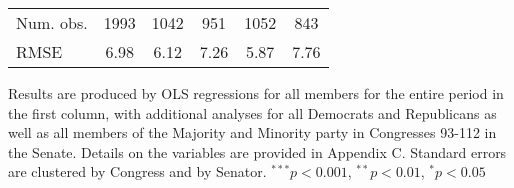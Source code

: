 \documentclass[12pt]{article}
\begin{document}
\begin{table}[H]
\begin{threeparttable}
\begin{tabular}{l c c c c c }
Num. obs.             & 1993          & 1042         & 951            & 1052         & 843          \\
RMSE                  & 6.98          & 6.12         & 7.26           & 5.87         & 7.76         \\
\hline
\end{tabular}
\begin{tablenotes}
   \item
   Results are produced by OLS regressions for all members for the entire period in the first column, with additional analyses for all Democrats and Republicans as well as all members of the Majority and Minority party in Congresses 93-112 in the Senate. Details on the variables are provided in Appendix C.
   Standard errors are clustered by Congress and by Senator.
$^{***}p<0.001$, $^{**}p<0.01$, $^*p<0.05$
 \end{tablenotes}
\end{threeparttable}
\end{table}



\end{document}
